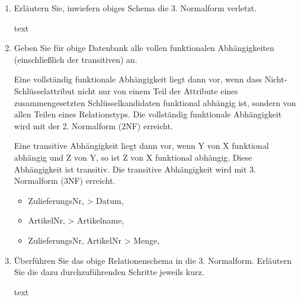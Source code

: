\documentclass{lehramt-informatik-aufgabe}
\begin{document}
\begin{enumerate}


\item Erläutern Sie, inwiefern obiges Schema die 3. Normalform verletzt.

\begin{antwort}
text
\end{antwort}


\item Geben Sie für obige Datenbank alle vollen funktionalen
Abhängigkeiten (einschließlich der transitiven) an.

\begin{antwort}

\begin{exkurs}
Eine vollständig funktionale Abhängigkeit liegt dann vor, wenn dass
Nicht-Schlüsselattribut nicht nur von einem Teil der Attribute eines
zusammengesetzten Schlüsselkandidaten funktional abhängig ist, sondern
von allen Teilen eines Relationstyps. Die vollständig funktionale
Abhängigkeit wird mit der 2. Normalform (2NF) erreicht.
\end{exkurs}

\begin{exkurs}
Eine transitive Abhängigkeit liegt dann vor, wenn Y von X funktional
abhängig und Z von Y, so ist Z von X funktional abhängig. Diese
Abhängigkeit ist transitiv. Die transitive Abhängigkeit wird mit 3.
Normalform (3NF) erreicht.
\end{exkurs}

\begin{itemize}
\item \liFA ZulieferungsNr, > Datum,
\item \liFA ArtikelNr, > Artikelname,
\item \liFA ZulieferungsNr, ArtikelNr > Menge,
\end{itemize}

\end{antwort}


\item Überführen Sie das obige Relationenschema in die 3. Normalform.
Erläutern Sie die dazu durchzuführenden Schritte jeweils kurz.

\begin{antwort}
text
\end{antwort}

\end{enumerate}
\end{document}

